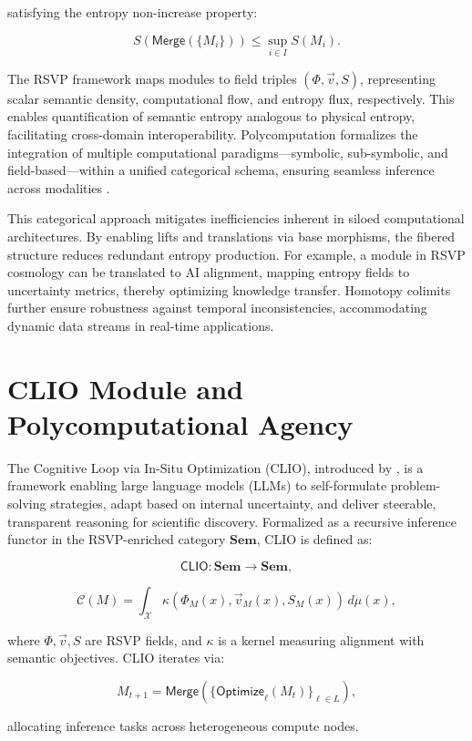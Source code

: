 \documentclass[12pt]{article}
\begin{document}
satisfying the entropy non-increase property:

\[ S(\mathsf{Merge}(\{M_i\})) \leq \sup_{i \in I} S(M_i). \]

The RSVP framework maps modules to field triples \( (\Phi, \vec{v}, S) \), representing scalar semantic density, computational flow, and entropy flux, respectively. This enables quantification of semantic entropy analogous to physical entropy, facilitating cross-domain interoperability. Polycomputation formalizes the integration of multiple computational paradigms—symbolic, sub-symbolic, and field-based—within a unified categorical schema, ensuring seamless inference across modalities \citep{AbramskyCoecke2004}.

This categorical approach mitigates inefficiencies inherent in siloed computational architectures. By enabling lifts and translations via base morphisms, the fibered structure reduces redundant entropy production. For example, a module in RSVP cosmology can be translated to AI alignment, mapping entropy fields to uncertainty metrics, thereby optimizing knowledge transfer. Homotopy colimits further ensure robustness against temporal inconsistencies, accommodating dynamic data streams in real-time applications.

\section{CLIO Module and Polycomputational Agency}
\label{sec:clio-polyagency}

The Cognitive Loop via In-Situ Optimization (CLIO), introduced by \citet{ChengBroadbentChappell2025}, is a framework enabling large language models (LLMs) to self-formulate problem-solving strategies, adapt based on internal uncertainty, and deliver steerable, transparent reasoning for scientific discovery. Formalized as a recursive inference functor in the RSVP-enriched category \( \mathbf{Sem} \), CLIO is defined as:

\[ \mathsf{CLIO}: \mathbf{Sem} \to \mathbf{Sem}, \]

\[ \mathcal{C}(M) = \int_{\mathcal{X}} \kappa(\Phi_M(x), \vec{v}_M(x), S_M(x)) \, d\mu(x), \]

where \( \Phi, \vec{v}, S \) are RSVP fields, and \( \kappa \) is a kernel measuring alignment with semantic objectives. CLIO iterates via:

\[ M_{t+1} = \mathsf{Merge}(\{ \mathsf{Optimize}_\ell(M_t) \}_{\ell \in L}), \]

allocating inference tasks across heterogeneous compute nodes.
\end{document}
